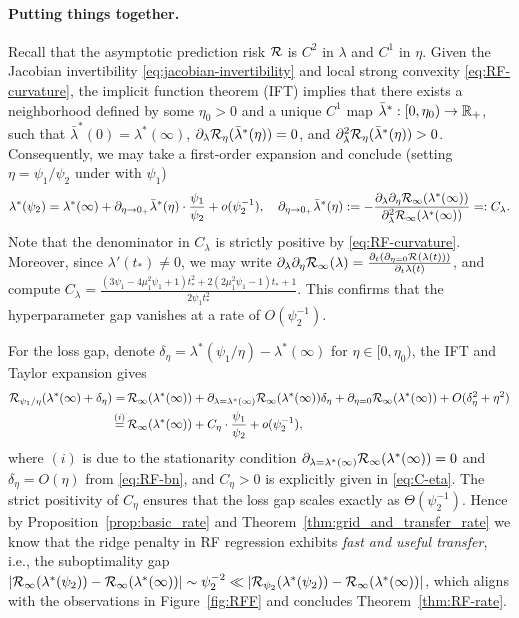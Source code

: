 \paragraph{Putting things together.} Recall that the asymptotic prediction risk ${\mathcal R}$ is $C^2$ in $\lambda$ and $C^1$ in $\eta$. 
Given the Jacobian invertibility \eqref{eq:jacobian-invertibility} and local strong convexity \eqref{eq:RF-curvature}, the implicit function theorem (IFT) implies that there exists a neighborhood defined by some $\eta_0>0$ and a unique $C^1$ map $\bar{\lambda}^*: [0,\eta_0)\to\mathbb{R}_+$, such that $\bar{\lambda}^*(0) = \lambda^*(\infty)$, $\partial_{\lambda} {\mathcal R}_{\eta}(\bar{\lambda}^*(\eta))=0$, and $\partial_{\lambda}^2 {\mathcal R}_{\eta}(\bar{\lambda}^*(\eta)) > 0$. Consequently, we may take a first-order expansion and conclude (setting $\eta=\psi_1/\psi_2$ under with $\psi_1$)
\begin{align}
    \lambda^*(\psi_2) = \lambda^*(\infty) + \partial_{\eta\to 0_+}\bar{\lambda}^*(\eta)\cdot \frac{\psi_1}{\psi_2} + o(\psi_2^{-1}), \quad
    \partial_{\eta\to 0_+}\bar{\lambda}^*(\eta) :=  -\frac{\partial_{\lambda}\partial_{\eta}{\mathcal R}_{\infty}(\lambda^*(\infty))}{\partial_{\lambda}^2{\mathcal R}_{\infty}(\lambda^*(\infty))} =: C_\lambda. 
    \label{eq:RF-bn}
\end{align}
Note that the denominator in $C_\lambda$ is strictly positive by \eqref{eq:RF-curvature}. Moreover, since $\lambda'(t_*)\neq 0$, we may write $\partial_{\lambda}\partial_{\eta}{\mathcal R}_{\infty}(\lambda) = \frac{\partial_t(\partial_{\eta=0}{\mathcal R}(\lambda(t)))}{\partial_t\lambda(t)}$, and compute
$
C_\lambda = \frac{(3\psi_1-4\mu_1^2\psi_1+1)t_*^2 + 2(2\mu_1^2\psi_1-1)t_* +1}{2\psi_1 t_*^2}. 
$ 
This confirms that the hyperparameter gap vanishes at a rate of $O(\psi_2^{-1})$. 

For the loss gap, denote $\delta_{\eta} = \lambda^*(\psi_1/\eta) - \lambda^*(\infty)$ for $\eta\in [0,\eta_0)$, the IFT and Taylor expansion gives
\begin{align*}
{\mathcal R}_{\psi_1/\eta}(\lambda^*(\infty) + \delta_\eta) 
=&\, {\mathcal R}_{\infty}(\lambda^*(\infty)) + \partial_{\lambda=\lambda^*(\infty)} {\mathcal R}_{\infty}(\lambda^*(\infty)) \delta_\eta + \partial_{\eta=0} {\mathcal R}_{\infty}(\lambda^*(\infty)) + O(\delta_\eta^2 + \eta^2) \\
\overset{(i)}{=}&\,
{\mathcal R}_{\infty}(\lambda^*(\infty)) + C_\eta\cdot \frac{\psi_1}{\psi_2} + o(\psi_2^{-1}),
\end{align*}
where $(i)$ is due to the stationarity condition $\partial_{\lambda=\lambda^*(\infty)} {\mathcal R}_{\infty}(\lambda^*(\infty))=0$ and $\delta_\eta = O(\eta)$ from \eqref{eq:RF-bn}, and $C_\eta>0$ is explicitly given in \eqref{eq:C-eta}. The strict positivity of $C_\eta$ ensures that the loss gap scales exactly as $\Theta(\psi_2^{-1})$. Hence by Proposition~\ref{prop:basic_rate} and Theorem~\ref{thm:grid_and_transfer_rate} we know that the ridge penalty in RF regression exhibits \textit{fast and useful transfer}, i.e., the suboptimality gap $\abs{{\mathcal R}_\infty(\lambda^*(\psi_2)) - {\mathcal R}_\infty(\lambda^*(\infty))} \sim \psi_2^{-2} \ll \abs{{\mathcal R}_{\psi_2}(\lambda^*(\psi_2)) - {\mathcal R}_{\infty}(\lambda^*(\infty))}$, which aligns with the observations in Figure~\ref{fig:RFF} and concludes Theorem~\ref{thm:RF-rate}. 

